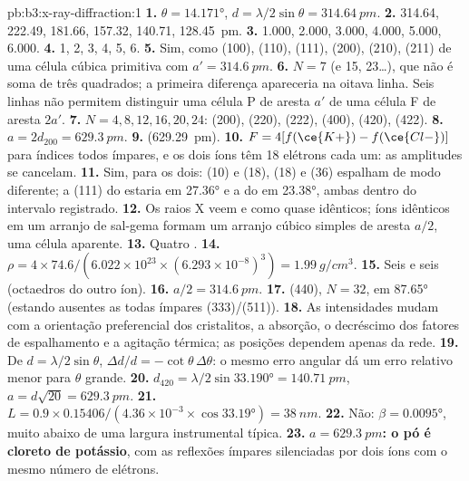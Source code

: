 \begin{solution}{pb:b3:x-ray-diffraction:1}
\textbf{1.} $\theta = \ang{14.171}$, $d = \lambda/2\sin\theta = \qty{314.64}{pm}$.
\textbf{2.} 314.64, 222.49, 181.66, 157.32, 140.71, \qty{128.45}{pm}.
\textbf{3.} 1.000, 2.000, 3.000, 4.000, 5.000, 6.000.
\textbf{4.} 1, 2, 3, 4, 5, 6.
\textbf{5.} Sim, como (100), (110), (111), (200), (210), (211) de uma célula cúbica primitiva
com $a' = \qty{314.6}{pm}$.
\textbf{6.} $N = 7$ (e 15, 23\dots), que não é soma de três quadrados; a primeira
diferença apareceria na oitava linha. Seis linhas não permitem distinguir uma
célula P de aresta $a'$ de uma célula F de aresta $2a'$.
\textbf{7.} $N = 4, 8, 12, 16, 20, 24$: (200), (220), (222), (400), (420), (422).
\textbf{8.} $a = 2d_{200} = \qty{629.3}{pm}$.
\textbf{9.}  (\qty{629.29}{pm}).
\textbf{10.} $F = 4[f(\ce{K+}) - f(\ce{Cl-})]$ para índices todos ímpares, e os dois íons têm 18
elétrons cada um: as amplitudes se cancelam.
\textbf{11.} Sim, para os dois:  (10) e  (18),  (18) e  (36)
espalham de modo diferente; a (111) do  estaria em \ang{27.36} e a do  em
\ang{23.38}, ambas dentro do intervalo registrado.
\textbf{12.} Os raios X veem  e  como quase idênticos; íons idênticos em
um arranjo de sal-gema formam um arranjo cúbico simples de aresta $a/2$, uma célula aparente.
\textbf{13.} Quatro .
\textbf{14.} $\rho = 4 \times 74.6/(6.022\times10^{23} \times (6.293\times10^{-8})^3) =
\qty{1.99}{g/cm^3}$.
\textbf{15.} Seis e seis (octaedros do outro íon).
\textbf{16.} $a/2 = \qty{314.6}{pm}$.
\textbf{17.} (440), $N = 32$, em \ang{87.65} (estando ausentes as todas ímpares (333)/(511)).
\textbf{18.} As intensidades mudam com a orientação preferencial dos cristalitos, a
absorção, o decréscimo dos fatores de espalhamento e a agitação térmica; as
posições dependem apenas da rede.
\textbf{19.} De $d = \lambda/2\sin\theta$, $\Delta d/d = -\cot\theta\,\Delta\theta$: o mesmo erro
angular dá um erro relativo menor para $\theta$ grande.
\textbf{20.} $d_{420} = \lambda/2\sin\ang{33.190} = \qty{140.71}{pm}$, $a = d\sqrt{20} =
\qty{629.3}{pm}$.
\textbf{21.} $L = 0.9 \times 0.15406/(4.36\times10^{-3} \times \cos\ang{33.19}) = \qty{38}{nm}$.
\textbf{22.} Não: $\beta = \ang{0.0095}$, muito abaixo de uma largura instrumental típica.
\textbf{23.} \textbf{$a = \qty{629.3}{pm}$: o pó é cloreto de potássio}, com as reflexões
ímpares silenciadas por dois íons com o mesmo número de elétrons.
\end{solution}
